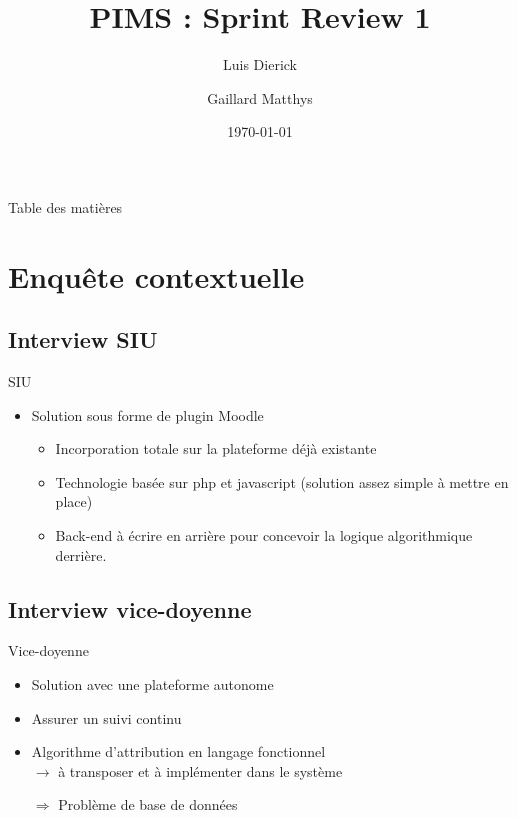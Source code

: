 \documentclass[numbering=fraction]{beamer}
\title{PIMS : Sprint Review 1}
\author[PIMS]{Luis Dierick \and Gaillard Matthys}
\institute{Université de Namur}
\date{\today}
\begin{document}
\begin{frame}[plain]{}
    \maketitle
\end{frame}

\begin{frame}{Table des matières}
    \tableofcontents
\end{frame}

\section{Enquête contextuelle}
\subsection{Interview SIU}

\begin{frame}{SIU}
    \begin{itemize}
        \item Solution sous forme de plugin Moodle
        \begin{itemize}
            \item Incorporation totale sur la plateforme déjà existante
            \item Technologie basée sur php et javascript (solution assez simple à mettre en place)
            \item Back-end à écrire en arrière pour concevoir la logique algorithmique derrière.
        \end{itemize}
    \end{itemize}
\end{frame}

\subsection{Interview vice-doyenne}


\begin{frame}{Vice-doyenne}
\begin{itemize}
    \item Solution avec une plateforme autonome
    \item Assurer un suivi continu
    \item Algorithme d'attribution en langage fonctionnel \\ $\rightarrow$ à transposer et à implémenter dans le système
    \item[$\Rightarrow$] Problème de base de données
\end{itemize}
\end{frame}
\end{document}
